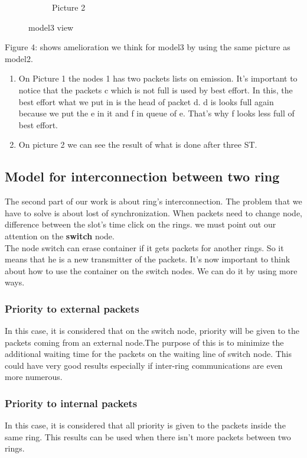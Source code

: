 \documentclass{article}
\begin{document}
\begin{figure}
\begin{subfigure}[b]{0.3\textwidth}
    \caption{Picture 2}
    \label{fig:2}
  \end{subfigure}
\caption{ model3 view}
\end{figure}


Figure 4: shows amelioration  we think for model3 by using the same picture as model2.
\begin{enumerate}[label=$\bullet$]
\item On Picture 1 the nodes 1 has two packets lists on emission. It's important to notice that the packets c which is not full is used by best effort. In this, the best effort what we put in is the head of packet d. d is looks full again because we put the e in it and f in queue of e. That's why f looks less full of best effort. 
\item On picture 2 we can see the result of what is done after three ST. 
\end{enumerate}

	 
\subsection{Model for  interconnection between two ring}
The second part of our work is about ring's interconnection. The problem that we have to solve is about lost of synchronization. When packets need to change node, difference between the slot's time click on the rings. we must point out our attention on the   \textbf{switch} node.\\
The node switch can erase container if it gets packets for another rings. So it means that he is a new 
transmitter of the packets. It's now important to think about how to use the container on the switch nodes. We can do it by using more ways.\\
\subsubsection{Priority to external packets}
In this case, it is considered that  on the switch node, priority will be given to the packets coming from an external node.The purpose of this is to minimize the additional waiting time for the packets on the waiting line of switch node. This could have very good results especially if inter-ring communications are even more numerous.\\

\subsubsection{Priority to internal packets}
In this case, it is considered that all priority is given to the packets inside the same ring. This results can be used when there isn't more packets between two rings. \\
\end{document}
